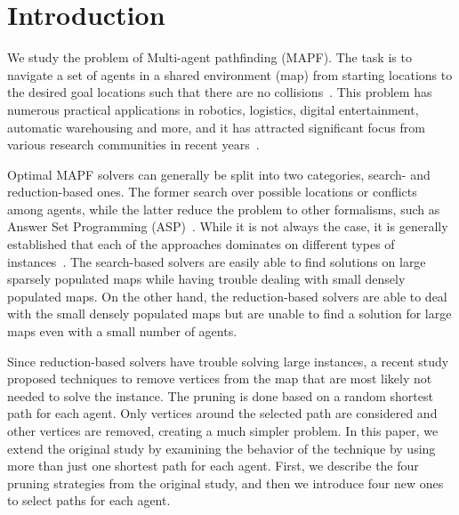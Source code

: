 \section{Introduction}

We study the problem of Multi-agent pathfinding (MAPF). The task is to navigate a set of agents in a shared environment (map) from starting locations to the desired goal locations such that there are no collisions~\cite{DBLP:conf/aiide/Silver05}. This problem has numerous practical applications in robotics, logistics, digital entertainment, automatic warehousing and more, and it has attracted significant focus from various research communities in recent years~\cite{sven_lifelong,DBLP:conf/ijcai/Surynek19,ngobsoscye17a,geobscra18a}.

Optimal MAPF solvers can generally be split into two categories, search- and reduction-based ones. The former search
over possible locations or conflicts among agents, while the latter reduce the problem to other formalisms, such as Answer Set Programming (ASP)~\cite{geobotscsangso18a}. While it is not always the case, it is generally established that each of the approaches dominates on different types of instances~\cite{DBLP:journals/access/GomezHB21,DBLP:conf/icaart/SvancaraB19}. The search-based solvers are easily able to find solutions on large sparsely populated maps while having trouble dealing with small densely populated maps. On the other hand, the reduction-based solvers are able to deal with the small densely populated maps but are unable to find a solution for large maps even with a small number of agents.

%
Since reduction-based solvers have trouble solving large instances, a recent study~\cite{AAMAS_corridors} proposed techniques to remove vertices from the map that are most likely not needed to solve the instance. The pruning is done based on a random shortest path for each agent. Only vertices around the selected path are considered and other vertices are removed, creating a much simpler problem. In this paper, we extend the original study by examining the behavior of the technique by using more than just one shortest path for each agent. First, we describe the four pruning strategies from the original study, and then we introduce four new ones to select paths for each agent.



